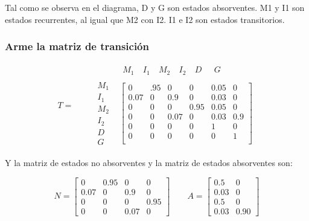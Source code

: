 \documentclass[11pt]{article}
\begin{document}
Tal como se observa en el diagrama, D y G son estados absorventes. 
M1 y I1 son estados recurrentes, al igual que M2 con I2.
I1 e I2 son estados transitorios.

\subsubsection{Arme la matriz de transición}

\[
T = \qquad
\begin{matrix}
 & \begin{matrix} M_1 \ & I_1 \ & M_2 \ & I_2 \ & D \ & \ \ G \end{matrix} \\
 \begin{matrix} M_1 \\ I_1 \\ M_2 \\ I_2 \\ D \\ G \end{matrix} &
\begin{bmatrix}
0 & .95 & 0 & 0 & 0.05 & 0 \\
0.07 & 0 & 0.9 & 0 & 0.03 & 0 \\
0 & 0 & 0 & 0.95 & 0.05 & 0 \\
0 & 0 & 0.07 & 0 & 0.03 & 0.9 \\
0 & 0 & 0 & 0 & 1 & 0 \\
0 & 0 & 0 & 0 & 0 & 1 \\
\end{bmatrix}

\end{matrix}
\]

Y la matriz de estados no absorventes y la matriz de estados absorventes son:

\[

N = \begin{bmatrix} 0 & 0.95 & 0 & 0 \\ 0.07 & 0 & 0.9 & 0 \\ 0 & 0 & 0 & 0.95 \\ 0 & 0 & 0.07 & 0 \end{bmatrix}

\qquad

A = \begin{bmatrix} 0.5 & 0 \\ 0.03 & 0 \\ 0.5 & 0 \\ 0.03 & 0.90 \end{bmatrix}

\]
\end{document}
